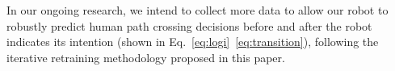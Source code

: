 \documentclass[conference]{IEEEtran}
\begin{document}

In our ongoing research, we intend to collect more data to allow our robot to robustly predict human path 
crossing decisions before and after the robot indicates its intention (shown in Eq.~\ref{eq:logi}~\ref{eq:transition}), following the iterative retraining methodology proposed in this paper.


{\footnotesize


}
\end{document}
